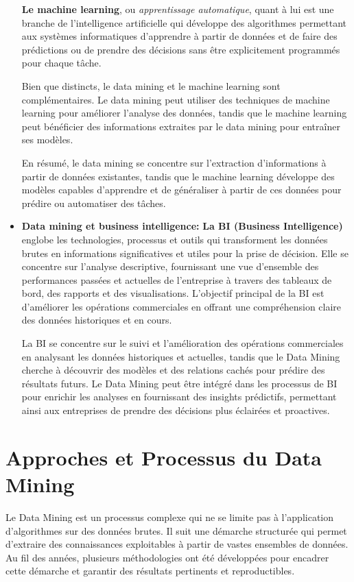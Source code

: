\documentclass[a4paper,14pt]{article}
\begin{document}
\begin{itemize}
                \textbf{Le machine learning}, ou \textit{apprentissage automatique}, quant à lui est une branche de l'intelligence artificielle qui développe des algorithmes permettant aux systèmes informatiques d'apprendre à partir de données et de faire des prédictions ou de prendre des décisions sans être explicitement programmés pour chaque tâche.
                
                Bien que distincts, le data mining et le machine learning sont complémentaires. Le data mining peut utiliser des techniques de machine learning pour améliorer l'analyse des données, tandis que le machine learning peut bénéficier des informations extraites par le data mining pour entraîner ses modèles. 
                
                En résumé, le data mining se concentre sur l'extraction d'informations à partir de données existantes, tandis que le machine learning développe des modèles capables d'apprendre et de généraliser à partir de ces données pour prédire ou automatiser des tâches.
                
                
            \item \textbf{Data mining et business intelligence: } 
                \textbf{La BI (Business Intelligence)} englobe les technologies, processus et outils qui transforment les données brutes en informations significatives et utiles pour la prise de décision. Elle se concentre sur l'analyse descriptive, fournissant une vue d'ensemble des performances passées et actuelles de l'entreprise à travers des tableaux de bord, des rapports et des visualisations. L'objectif principal de la BI est d'améliorer les opérations commerciales en offrant une compréhension claire des données historiques et en cours.
                
                La BI se concentre sur le suivi et l'amélioration des opérations commerciales en analysant les données historiques et actuelles, tandis que le Data Mining cherche à découvrir des modèles et des relations cachés pour prédire des résultats futurs. Le Data Mining peut être intégré dans les processus de BI pour enrichir les analyses en fournissant des insights prédictifs, permettant ainsi aux entreprises de prendre des décisions plus éclairées et proactives.
        \end{itemize}
            

\section{Approches et Processus du Data Mining}
    Le Data Mining est un processus complexe qui ne se limite pas à l’application d’algorithmes sur des données brutes. Il suit une démarche structurée qui permet d’extraire des connaissances exploitables à partir de vastes ensembles de données. Au fil des années, plusieurs méthodologies ont été développées pour encadrer cette démarche et garantir des résultats pertinents et reproductibles.
    
\end{document}
